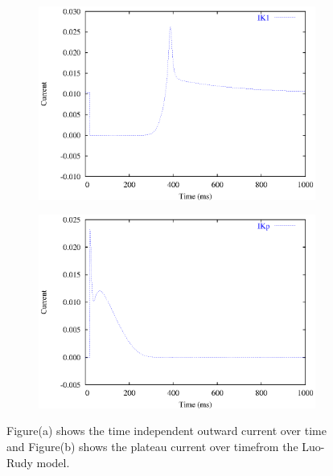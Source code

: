 \begin{figure}[hbtp] 
  \centering
  \begin{subfigure}[b]{0.45\linewidth}
    \centering
    \includegraphics[width=\textwidth]{cardiac_electrophysiology/epsfiles/LR_IK1.eps}
    \caption{}
  \end{subfigure}
  \hfill
  \begin{subfigure}[b]{0.45\linewidth}
    \centering
    \includegraphics[width=\textwidth]{cardiac_electrophysiology/epsfiles/LR_IKp.eps}
    \caption{}
  \end{subfigure}
  \caption[Time independent and plateau currents from the Luo-Rudy model]{Figure(a) shows the
    time independent outward current over time and Figure(b) shows the plateau
    current over timefrom the Luo-Rudy model.}
  \label{fig:LR_IK1p_traces}
\end{figure}
%
